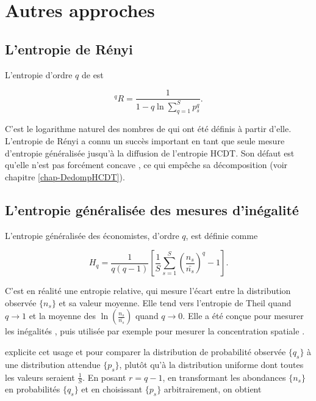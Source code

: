 \documentclass[
  11pt,
  french,
  a4paper,
  extrafontsizes,onecolumn,openright
  ]{memoir}
\begin{document}
\hypertarget{autres-approches}{%
\section{Autres approches}\label{autres-approches}}

\hypertarget{lentropie-de-ruxe9nyi}{%
\subsection{L'entropie de Rényi}\label{lentropie-de-ruxe9nyi}}

L'entropie d'ordre \(q\) de \textcite{Renyi1961} est

\begin{equation}
  \label{eq:Renyi}
  ^{q}\!R =\frac{1}{1-q\ln\sum^S_{q=1}{p^q_s}}.
\end{equation}

C'est le logarithme naturel des nombres de \textcite{Hill1973} qui ont été définis à partir d'elle.
L'entropie de Rényi a connu un succès important en tant que seule mesure d'entropie généralisée jusqu'à la diffusion de l'entropie HCDT.
Son défaut est qu'elle n'est pas forcément concave \autocite{Beck2009}, ce qui empêche sa décomposition (voir chapitre \ref{chap-DedompHCDT}).

\hypertarget{lentropie-guxe9nuxe9ralisuxe9e-des-mesures-dinuxe9galituxe9}{%
\subsection{L'entropie généralisée des mesures d'inégalité}\label{lentropie-guxe9nuxe9ralisuxe9e-des-mesures-dinuxe9galituxe9}}

L'entropie généralisée des économistes, d'ordre \(q\), est définie comme

\begin{equation}
  \label{eq:HqEco}
  H_q = \frac{1}{q\left(q-1\right)} \left[\frac{1}{S}\sum^S_{s=1}{\left(\frac{n_s}{\bar{n_s}}\right)^{q}}-1\right].
\end{equation}

C'est en réalité une entropie relative, qui mesure l'écart entre la distribution observée \(\{n_s\}\) et sa valeur moyenne. Elle tend vers l'entropie de Theil quand \(q \to 1\) et la moyenne des \(\ln(\frac{n_s}{\bar{n_s}})\) quand \(q \to 0\).
Elle a été conçue pour mesurer les inégalités \autocite{Cowell2000}, puis utilisée par exemple pour mesurer la concentration spatiale \autocite{Brulhart2005}.

\textcite{Maasoumi1993} explicite cet usage et pour comparer la distribution de probabilité observée \(\{q_s\}\) à une distribution attendue \(\{p_s\}\), plutôt qu'à la distribution uniforme dont toutes les valeurs seraient \(\frac{1}{S}\). En posant \(r=q-1\), en transformant les abondances \(\{n_s\}\) en probabilités \(\{q_s\}\) et en choisissant \(\{p_s\}\) arbitrairement, on obtient
\end{document}
